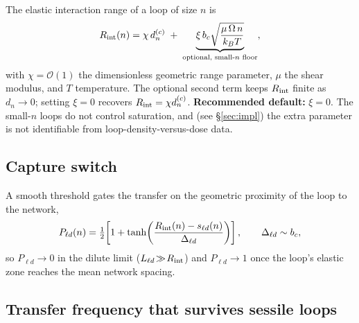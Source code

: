 \documentclass[11pt,a4paper]{article}
\begin{document}
The elastic interaction range of a loop of size $n$ is
\begin{equation}
  R_{\rm int}(n)=\chi\,d_n^{(c)}
  \;+\;\underbrace{\xi\,b_c\sqrt{\dfrac{\mu\,\Omega\,n}{k_B T}}}_{\text{optional, small-$n$ floor}},
  \label{eq:elastic_interaction_zone}
\end{equation}
with $\chi=\mathcal{O}(1)$ the dimensionless geometric range parameter, $\mu$
the shear modulus, and $T$ temperature.  The optional second term keeps
$R_{\rm int}$ finite as $d_n\!\to\!0$; setting $\xi=0$ recovers
$R_{\rm int}=\chi d_n^{(c)}$.  \textbf{Recommended default:} $\xi=0$.  The
small-$n$ loops do not control saturation, and (see
\S\ref{sec:impl}) the extra parameter is not identifiable from
loop-density-versus-dose data.

\subsection*{Capture switch}

A smooth threshold gates the transfer on the geometric proximity of the loop
to the network,
\begin{equation}
  P_{\ell d}(n)
  =\tfrac12\!\left[1+\tanh\!\left(\frac{R_{\rm int}(n)-s_{\ell d}(n)}{\Delta_{\ell d}}\right)\right],
  \qquad \Delta_{\ell d}\sim b_c,
  \label{eq:P_loop_dislocation}
\end{equation}
so $P_{\ell d}\!\to\!0$ in the dilute limit ($L_{\ell d}\!\gg\!R_{\rm int}$)
and $P_{\ell d}\!\to\!1$ once the loop's elastic zone reaches the mean network
spacing.

\subsection*{Transfer frequency that survives sessile loops}
\end{document}
